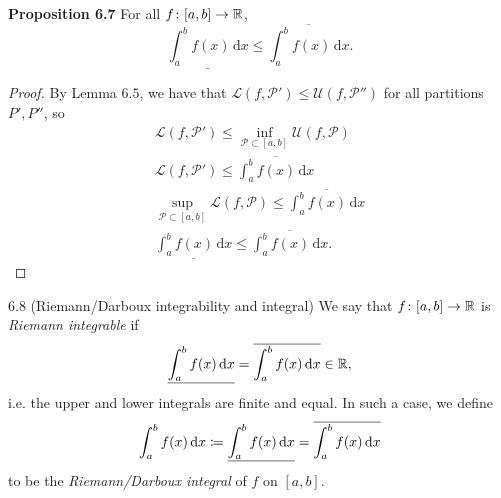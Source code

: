 \documentclass[class=article, crop=false]{standalone}
\begin{document}
  \textbf{Proposition 6.7} For all $f\colon [a, b]\to \mathbb{R}$,
  \[
    \underline{\int_{a}^{b}f(x) \,\mathrm dx}\leq \overline{\int_{a}^{b}f(x) \,\mathrm dx}.
  \]
  \begin{proof}
    By Lemma $6.5$, we have that $\mathcal{L}(f, \mathcal{P}')\leq \mathcal{U}(f, \mathcal{P}'')$ for all partitions $P', P''$, so
    \begin{align*}
      \mathcal{L}(f, \mathcal{P}') \leq \inf_{\mathcal{P}\subset [a, b]}\mathcal{U}(f, \mathcal{P}) \\
      \mathcal{L}(f, \mathcal{P}') \leq \overline{\int_{a}^{b}f(x) \,\mathrm dx} \\
      \sup_{\mathcal{P}\subset [a, b]}\mathcal{L}(f, \mathcal{P}) \leq \overline{\int_{a}^{b}f(x) \,\mathrm dx} \\
      \underline{\int_{a}^{b}f(x) \,\mathrm dx}\leq \overline{\int_{a}^{b}f(x) \,\mathrm dx}.
    \end{align*}
  \end{proof}
  \begin{definition}{6.8 (Riemann/Darboux integrability and integral)}
    We say that $f\colon [a, b]\to \mathbb{R}$ is \emph{Riemann integrable} if 
    \[
      \underline{\int_{a}^{b}f(x) \,\mathrm dx} = \overline{\int_{a}^{b}f(x) \,\mathrm dx}\in\mathbb{R},
    \]
    i.e. the upper and lower integrals are finite and equal. In such a case, we define
    \[
      \int_{a}^{b}f(x) \,\mathrm dx\coloneqq \underline{\int_{a}^{b}f(x) \,\mathrm dx} = \overline{\int_{a}^{b}f(x) \,\mathrm dx}
    \]
    to be the \emph{Riemann/Darboux integral} of $f$ on $[a, b]$.
  \end{definition}
\end{document}
